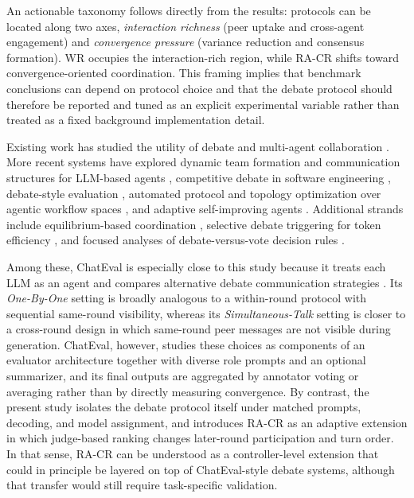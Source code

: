 \documentclass[11pt]{article}
\begin{document}
An actionable taxonomy follows directly from the results: protocols can be located along two axes, \emph{interaction richness} (peer uptake and cross-agent engagement) and \emph{convergence pressure} (variance reduction and consensus formation). WR occupies the interaction-rich region, while RA-CR shifts toward convergence-oriented coordination. This framing implies that benchmark conclusions can depend on protocol choice and that the debate protocol should therefore be reported and tuned as an explicit experimental variable rather than treated as a fixed background implementation detail.

Existing work has studied the utility of debate and multi-agent collaboration \citep{du2024debate,liang2024divergent,wu2024autogen,li2023camel,hong2023metagpt}. More recent systems have explored dynamic team formation and communication structures for LLM-based agents \citep{liu2024dylan}, competitive debate in software engineering \citep{swedebate2025}, debate-style evaluation \citep{chan2023chateval}, automated protocol and topology optimization over agentic workflow spaces \citep{maas2025,zhang2024aflow}, and adaptive self-improving agents \citep{shinn2023reflexion}. Additional strands include equilibrium-based coordination \citep{xie2025equilibrium}, selective debate triggering for token efficiency \citep{fan2026imad}, and focused analyses of debate-versus-vote decision rules \citep{choi2025debatevote}.

Among these, ChatEval is especially close to this study because it treats each LLM as an agent and compares alternative debate communication strategies \citep{chan2023chateval}. Its \emph{One-By-One} setting is broadly analogous to a within-round protocol with sequential same-round visibility, whereas its \emph{Simultaneous-Talk} setting is closer to a cross-round design in which same-round peer messages are not visible during generation. ChatEval, however, studies these choices as components of an evaluator architecture together with diverse role prompts and an optional summarizer, and its final outputs are aggregated by annotator voting or averaging rather than by directly measuring convergence. By contrast, the present study isolates the debate protocol itself under matched prompts, decoding, and model assignment, and introduces RA-CR as an adaptive extension in which judge-based ranking changes later-round participation and turn order. In that sense, RA-CR can be understood as a controller-level extension that could in principle be layered on top of ChatEval-style debate systems, although that transfer would still require task-specific validation.
\end{document}
